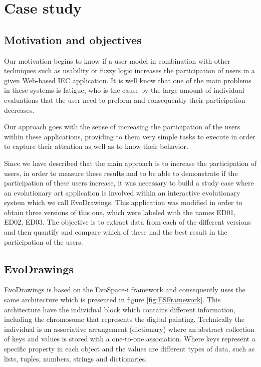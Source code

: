 \chapter{Case study} \label{sec:4}




\section{Motivation and objectives}

Our motivation begins to know if a user model in combination with
other techniques such as usability or fuzzy logic increases the participation of users in a
given Web-based IEC application. It is well know that one of the main
problems in these systems is fatigue, who is the cause by the large 
amount of individual evaluations
that the user need to preform and consequently their participation decreases.

Our approach goes with the sense of increasing the participation of the users
within these applications, providing to them very simple tasks to execute in order to
capture their attention as well as to know their behavior.


Since we have described that the main approach is to increase the participation
of users, in order to measure these results and to be able to demonstrate 
if the participation 
of these users increase, it was necessary to build a study
case where an evolutionary art application is involved within an interactive
evolutionary system which we call EvoDrawings. This application was modified in
order to obtain three versions of this one, which were labeled with the names
ED01, ED02, ED03. The objective is to extract data from each of the different
versions and then quantify and compare which of these had the best result in the
participation of the users.

\section{EvoDrawings} EvoDrawings is based on the EvoSpace-i framework and
consequently uses the same architecture which is presented in figure
\ref{fig:ESFramework}. This architecture have the individual block which
contains different information, including the chromosome that represents the
digital painting. Technically the individual is an associative arrangement
(dictionary) where an abstract collection of keys and values is stored with a
one-to-one association. Where keys represent a specific property in each object
and the values are different types of data, such as lists, tuples, numbers,
strings and dictionaries.

